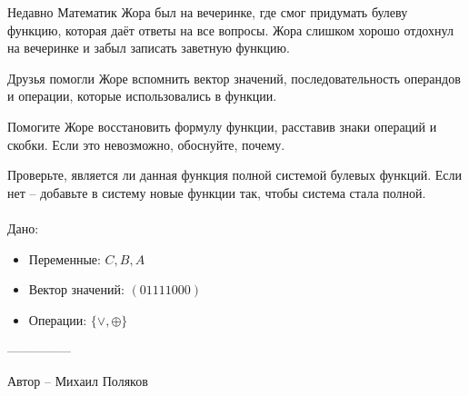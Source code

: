 \question
Недавно Математик Жора был на вечеринке, где смог придумать булеву функцию, которая даёт ответы на все вопросы. Жора слишком хорошо отдохнул на вечеринке и забыл записать заветную функцию.

Друзья помогли Жоре вспомнить вектор значений, последовательность операндов и операции, которые использовались в функции.

Помогите Жоре восстановить формулу функции, расставив знаки операций и скобки. Если это невозможно, обоснуйте, почему.

Проверьте, является ли данная функция полной системой булевых функций. Если нет -- добавьте в систему новые функции так, чтобы система стала полной.
\\
\\
Дано:
\begin{itemize}
\item Переменные: $C, B, A$
\item Вектор значений: $(01111000)$
\item Операции: $\{\lor, \oplus\}$
\end{itemize}

---------------

Автор -- Михаил Поляков
